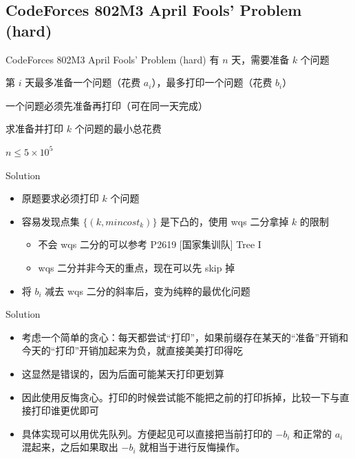 ﻿\documentclass[aspectratio=169,handout]{ctexbeamer}
\begin{document}
\subsection{CodeForces 802M3 April Fools' Problem (hard)}
\begin{frame}{CodeForces 802M3 April Fools' Problem (hard)}
    有 $n$ 天，需要准备 $k$ 个问题

第 $i$ 天最多准备一个问题（花费 $a_i$），最多打印一个问题（花费 $b_i$）

一个问题必须先准备再打印（可在同一天完成）

求准备并打印 $k$ 个问题的最小总花费

$n\leq 5\times 10^5$
\end{frame}

\begin{frame}{Solution}
    \begin{itemize}
        \item 原题要求必须打印 $k$ 个问题
        \pause
        \item 容易发现点集 $\{(k,mincost_k)\}$ 是下凸的，使用 wqs 二分拿掉 $k$ 的限制
        \begin{itemize}
            \item 不会 wqs 二分的可以参考 P2619 [国家集训队] Tree I
            \item wqs 二分并非今天的重点，现在可以先 skip 掉
        \end{itemize}
        \pause
        \item 将 $b_i$ 减去 wqs 二分的斜率后，变为纯粹的最优化问题
    \end{itemize}
\end{frame}


\begin{frame}{Solution}
    \begin{itemize}
        \item 考虑一个简单的贪心：每天都尝试“打印”，如果前缀存在某天的“准备”开销和今天的“打印”开销加起来为负，就直接美美打印得吃
        \pause
        \item 这显然是错误的，因为后面可能某天打印更划算
        \pause
        \item 因此使用反悔贪心。打印的时候尝试能不能把之前的打印拆掉，比较一下与直接打印谁更优即可
        \pause
        \item 具体实现可以用优先队列。方便起见可以直接把当前打印的 $-b_i$ 和正常的 $a_i$ 混起来，之后如果取出 $-b_i$ 就相当于进行反悔操作。
    \end{itemize}
\end{frame}
\end{document}
